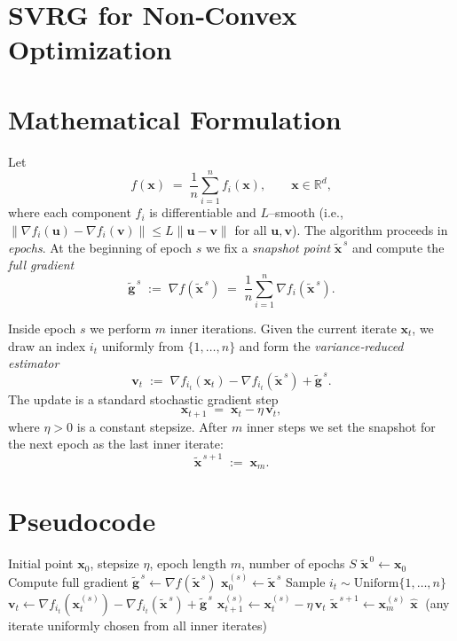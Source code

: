 \documentclass{article}
\newcommand{\RR}{\mathbb{R}}
\begin{document}
\section*{SVRG for Non‑Convex Optimization}

\section*{Mathematical Formulation}
Let 
\[
f(\mathbf{x})\;=\;\frac1n\sum_{i=1}^{n} f_i(\mathbf{x}),\qquad 
\mathbf{x}\in\RR^{d},
\]
where each component $f_i$ is differentiable and $L$–smooth (i.e., $\|\nabla f_i(\mathbf{u})-\nabla f_i(\mathbf{v})\|\le L\|\mathbf{u}-\mathbf{v}\|$ for all $\mathbf{u},\mathbf{v}$).  
The algorithm proceeds in \emph{epochs}.  
At the beginning of epoch $s$ we fix a \emph{snapshot point} $\tilde{\mathbf{x}}^{\,s}$ and compute the \emph{full gradient}
\[
\tilde{\mathbf{g}}^{\,s}\;:=\;\nabla f(\tilde{\mathbf{x}}^{\,s})\;=\;\frac1n\sum_{i=1}^{n}\nabla f_i(\tilde{\mathbf{x}}^{\,s}).
\]

Inside epoch $s$ we perform $m$ inner iterations.  
Given the current iterate $\mathbf{x}_t$, we draw an index $i_t$ uniformly from $\{1,\dots,n\}$ and form the \emph{variance‑reduced estimator}
\[
\mathbf{v}_t\;:=\;\nabla f_{i_t}(\mathbf{x}_t)-\nabla f_{i_t}(\tilde{\mathbf{x}}^{\,s})+\tilde{\mathbf{g}}^{\,s}.
\tag{1}
\]
The update is a standard stochastic gradient step
\[
\mathbf{x}_{t+1}\;=\;\mathbf{x}_t-\eta\,\mathbf{v}_t,
\tag{2}
\]
where $\eta>0$ is a constant stepsize.  
After $m$ inner steps we set the snapshot for the next epoch as the last inner iterate:
\[
\tilde{\mathbf{x}}^{\,s+1}\;:=\;\mathbf{x}_{m}.
\]

\section*{Pseudocode}
\begin{algorithm}[H]
\caption{SVRG (non‑convex)}\label{alg:svrg}
\begin{algorithmic}[1]
\REQUIRE Initial point $\mathbf{x}_0$, stepsize $\eta$, epoch length $m$, number of epochs $S$
\STATE $\tilde{\mathbf{x}}^{\,0}\gets\mathbf{x}_0$
    \STATE Compute full gradient $\tilde{\mathbf{g}}^{\,s}\gets \nabla f(\tilde{\mathbf{x}}^{\,s})$
    \STATE $\mathbf{x}_0^{(s)}\gets \tilde{\mathbf{x}}^{\,s}$
        \STATE Sample $i_t\sim\text{Uniform}\{1,\dots,n\}$
        \STATE $\mathbf{v}_t\gets \nabla f_{i_t}(\mathbf{x}_t^{(s)})-\nabla f_{i_t}(\tilde{\mathbf{x}}^{\,s})+\tilde{\mathbf{g}}^{\,s}$ 
        \STATE $\mathbf{x}_{t+1}^{(s)}\gets \mathbf{x}_t^{(s)}-\eta\,\mathbf{v}_t$ 
    \ENDFOR
    \STATE $\tilde{\mathbf{x}}^{\,s+1}\gets \mathbf{x}_m^{(s)}$
\ENDFOR
\RETURN $\hat{\mathbf{x}}\;$ (any iterate uniformly chosen from all inner iterates)
\end{algorithmic}
\end{algorithm}
\end{document}
